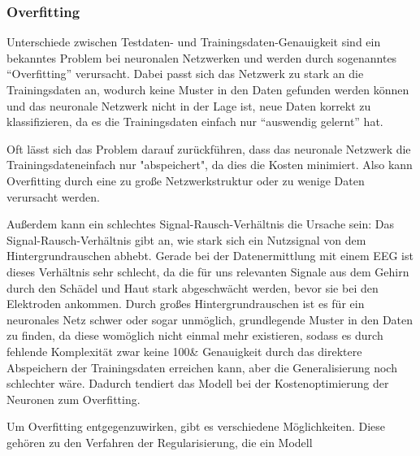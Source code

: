 \documentclass[10pt]{article}
\newcommand{\form}[1]{#1} %
\newcommand{\feng}[1]{{#1}}
\newcommand{\sig}{\textrm{sig}}
\begin{document}

\subsubsection{Overfitting}

Unterschiede zwischen Testdaten- und Trainingsdaten-Genauigkeit sind ein bekanntes Problem bei neuronalen Netzwerken und werden durch sogenanntes \enquote{Overfitting} verursacht.
Dabei passt sich das Netzwerk zu stark an die Trainingsdaten an, wodurch keine Muster in den Daten gefunden werden können und das neuronale Netzwerk nicht in der Lage ist, neue Daten korrekt zu klassifizieren, da es die Trainingsdaten einfach nur \enquote{auswendig gelernt} hat.  %
 
Oft lässt sich das Problem darauf zurückführen, dass das neuronale Netzwerk die Trainingsdateneinfach nur "abspeichert", da dies die Kosten minimiert. Also kann Overfitting durch eine zu große Netzwerkstruktur oder zu wenige Daten verursacht werden.
 
Außerdem kann ein schlechtes Signal-Rausch-Verhältnis die Ursache sein: Das Signal-Rausch-Verhältnis gibt an, wie stark sich ein Nutzsignal von dem Hintergrundrauschen abhebt. 
Gerade bei der Datenermittlung mit einem EEG ist dieses Verhältnis sehr schlecht, da die für uns relevanten Signale aus dem Gehirn durch den Schädel und Haut stark abgeschwächt werden, bevor sie bei den Elektroden ankommen. 
Durch großes Hintergrundrauschen ist es für ein neuronales Netz schwer oder sogar unmöglich, grundlegende Muster in den Daten zu finden, da diese womöglich nicht einmal mehr existieren, sodass es durch fehlende Komplexität zwar keine 100\& Genauigkeit durch das direktere Abspeichern der Trainingsdaten erreichen kann, aber die Generalisierung noch schlechter wäre. 
Dadurch tendiert das Modell bei der Kostenoptimierung der Neuronen zum Overfitting.

Um Overfitting entgegenzuwirken, gibt es verschiedene Möglichkeiten. 
Diese gehören zu den Verfahren der Regularisierung, die ein Modell
\end{document}
